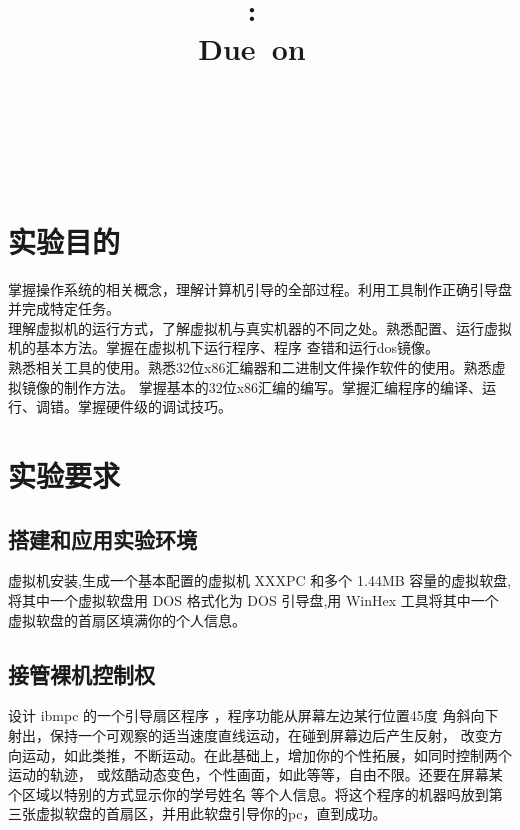 \documentclass[a4paper]{article}
\title{
\vspace{2in}
\textmd{\textbf{\hmwkClass:\ \hmwkTitle}}\\
\normalsize\vspace{0.1in}\small{Due\ on\ \hmwkDueDate}\\
\vspace{0.1in}\large{\textit{\hmwkClassInstructor\ \hmwkClassTime}}
\vspace{3in}
}
\author{\textbf{\LARGE{\hmwkAuthorName}} \\ \\ \textbf{\LARGE{\hmwkAuthorId}}}
\date{} %
\begin{document}

\maketitle


\setcounter{tocdepth}{2} %


\renewcommand{\cftsecleader}{\cftdotfill{\cftdotsep}} %
\renewcommand{\contentsname}{Content} %
\newpage
\tableofcontents
{}
\newpage



\section{实验目的}
掌握操作系统的相关概念，理解计算机引导的全部过程。利用工具制作正确引导盘并完成特定任务。\\ 

理解虚拟机的运行方式，了解虚拟机与真实机器的不同之处。熟悉配置、运行虚拟机的基本方法。掌握在虚拟机下运行程序、程序
查错和运行dos镜像。\\ 

熟悉相关工具的使用。熟悉32位x86汇编器和二进制文件操作软件的使用。熟悉虚拟镜像的制作方法。
掌握基本的32位x86汇编的编写。掌握汇编程序的编译、运行、调错。掌握硬件级的调试技巧。
\section{实验要求}

\subsection{搭建和应用实验环境}
虚拟机安装,生成一个基本配置的虚拟机 XXXPC 和多个 1.44MB 
容量的虚拟软盘,将其中一个虚拟软盘用 DOS 格式化为 DOS 引导盘,用 WinHex 工具将其中一个虚拟软盘的首扇区填满你的个人信息。
\subsection{接管裸机控制权}
设计 ibmpc 的一个引导扇区程序
，程序功能从屏幕左边某行位置45度
角斜向下射出，保持一个可观察的适当速度直线运动，在碰到屏幕边后产生反射，
改变方向运动，如此类推，不断运动。在此基础上，增加你的个性拓展，如同时控制两个运动的轨迹，
或炫酷动态变色，个性画面，如此等等，自由不限。还要在屏幕某个区域以特别的方式显示你的学号姓名
等个人信息。将这个程序的机器吗放到第三张虚拟软盘的首扇区，并用此软盘引导你的pc，直到成功。
\end{document}
